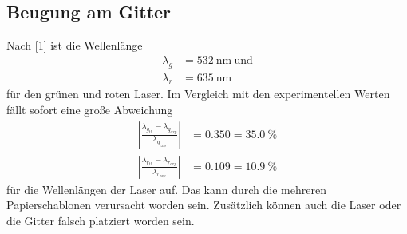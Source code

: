 \subsection{Beugung am Gitter}
Nach [1] ist die Wellenlänge 
\begin{align*}
  \lambda_g&=532\ \textrm{nm}\ \textrm{und}\\
  \lambda_r&=635\ \textrm{nm}
\end{align*}
für den grünen und roten Laser. Im Vergleich mit den experimentellen Werten fällt sofort eine große Abweichung
\begin{align*}
  |\frac{\lambda_{g_{th}} - \lambda_{g_{exp}}}{\lambda_{g_{exp}}}|&=0.350=35.0\ \% \\
  |\frac{\lambda_{r_{th}} - \lambda_{r_{exp}}}{\lambda_{r_{exp}}}|&=0.109=10.9\ \%
\end{align*}
für die Wellenlängen der Laser auf. Das kann durch die mehreren Papierschablonen verursacht worden sein. Zusätzlich können auch die Laser oder die Gitter falsch platziert worden sein.
